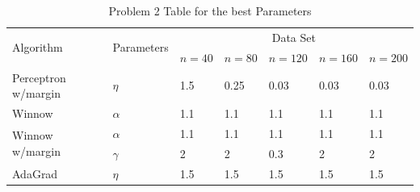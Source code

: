 \begin{table}[!hbp]
	\begin{tabular}{|p{4.7cm}<{\centering}|p{2.0cm}<{\centering}|p{1.5cm}<{\centering}|p{1.5cm}<{\centering}|p{1.5cm}<{\centering}|p{1.5cm}<{\centering}|p{1.5cm}<{\centering}|}
		\hline
		\multirow{2}{*}{Algorithm} & \multirow{2}{*}{Parameters} & \multicolumn{5}{|c|}{Data Set} \\
		\cline{3-7}
		& & $n=40$& $n=80$& $n=120$& $n=160$& $n=200$\\
		\hline
		Perceptron w/margin &          $\eta$          &       1.5            &  0.25   & 0.03 & 0.03 &       0.03                       \\\hline
		
		Winnow               &     $\alpha$           &      1.1               &     1.1    & 1.1 & 1.1 &        1.1                  \\\hline %
		\multirow{2}{*}{Winnow w/margin}     &  $\alpha$&              1.1                       & 1.1    & 1.1 & 1.1 &         1.1       \\
		\cline{2-7}
		& $\gamma$ &  2 &  2 & 0.3 & 2 & 2 \\ \hline %
		AdaGrad             &  $\eta$&                      1.5                &  1.5             & 1.5& 1.5&       1.5             \\\hline %
	\end{tabular}
	\caption{Problem 2 Table for the best Parameters}
\end{table}

